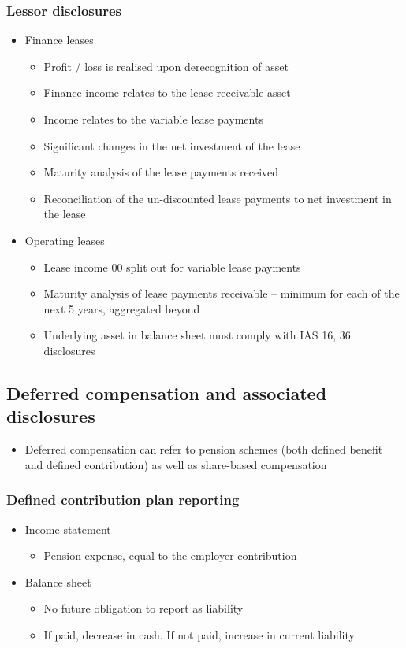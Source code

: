 \documentclass[../notes_compiled.tex]{subfiles}
\begin{document}
\subsubsection{Lessor disclosures}
\begin{itemize}
\item Finance leases
\begin{itemize}
\item Profit / loss is realised upon derecognition of asset
\item Finance income relates to the lease receivable asset
\item Income relates to the variable lease payments
\item Significant changes in the net investment of the lease
\item Maturity analysis of the lease payments received
\item Reconciliation of the un-discounted lease payments to net investment in the lease
\end{itemize}
\item Operating leases
\begin{itemize}
\item Lease income 00 split out for variable lease payments
\item Maturity analysis of lease payments receivable
-- minimum for each of the next 5 years, aggregated beyond
\item Underlying asset in balance sheet must comply with IAS 16, 36 disclosures
\end{itemize}
\end{itemize}

\subsection{Deferred compensation and associated disclosures}
\begin{itemize}
\item Deferred compensation can refer to pension schemes (both defined benefit and defined contribution) as well as share-based compensation
\end{itemize}

\subsubsection{Defined contribution plan reporting}
\begin{itemize}
\item Income statement
\begin{itemize}
\item Pension expense, equal to the employer contribution
\end{itemize}
\item Balance sheet 
\begin{itemize}
\item No future obligation to report as liability
\item If paid, decrease in cash. If not paid, increase in current liability
\end{itemize}
\end{itemize}
\end{document}
